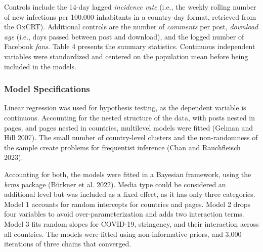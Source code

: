 \documentclass[
]{ccr}
\begin{document}
Controls include the 14-day lagged \emph{incidence rate} (i.e., the
weekly rolling number of new infections per 100.000 inhabitants in a
country-day format, retrieved from the OxCRT). Additional controls are
the number of \emph{comments} per post, \emph{download age} (i.e., days
passed between post and download), and the logged number of Facebook
\emph{fans}. Table 4 presents the summary statistics. Continuous
independent variables were standardized and centered on the population
mean before being included in the models.

\hypertarget{model-specifications}{%
\subsubsection{Model Specifications}\label{model-specifications}}

Linear regression was used for hypothesis testing, as the dependent
variable is continuous. Accounting for the nested structure of the data,
with posts nested in pages, and pages nested in countries, multilevel
models were fitted (Gelman and Hill 2007). The small number of
country-level clusters and the non-randomness of the sample create
problems for frequentist inference (Chan and Rauchfleisch 2023).

Accounting for both, the models were fitted in a Bayesian framework,
using the \emph{brms} package (Bürkner et al. 2022). Media type could be
considered an additional level but was included as a fixed effect, as it
has only three categories. Model 1 accounts for random intercepts for
countries and pages. Model 2 drops four variables to avoid
over-parameterization and adds two interaction terms. Model 3 fits
random slopes for COVID-19, stringency, and their interaction across all
countries. The models were fitted using non-informative priors, and
3,000 iterations of three chains that converged.
\end{document}
